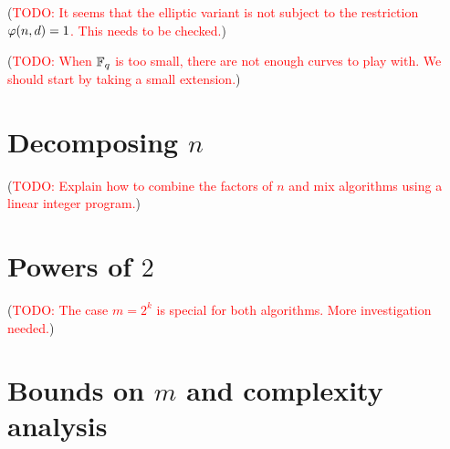 \documentclass{article}
\newcommand{\todo}[1]{(\textcolor{red}{TODO: #1})}
\begin{document}
\todo{It seems that the elliptic variant is not subject to the
  restriction $\varphi(n,d)=1$. This needs to be checked.}

\todo{When $\mathbb{F}_q$ is too small, there are not enough curves to play
  with. We should start by taking a small extension.}

\section{Decomposing $n$}

\todo{Explain how to combine the factors of $n$ and mix algorithms
  using a linear integer program.}

\section{Powers of $2$}

\todo{The case $m=2^k$ is special for both algorithms. More
  investigation needed.}


\section{Bounds on $m$ and complexity analysis}
\end{document}
